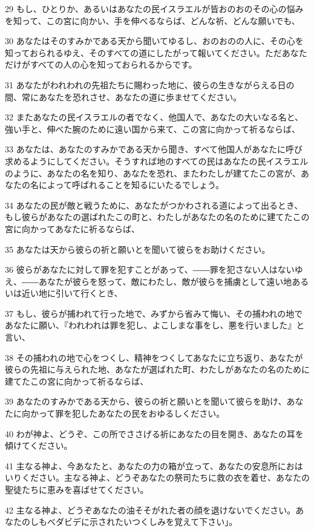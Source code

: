 \par 29 もし、ひとりか、あるいはあなたの民イスラエルが皆おのおのその心の悩みを知って、この宮に向かい、手を伸べるならば、どんな祈、どんな願いでも、
\par 30 あなたはそのすみかである天から聞いてゆるし、おのおのの人に、その心を知っておられるゆえ、そのすべての道にしたがって報いてください。ただあなただけがすべての人の心を知っておられるからです。
\par 31 あなたがわれわれの先祖たちに賜わった地に、彼らの生きながらえる日の間、常にあなたを恐れさせ、あなたの道に歩ませてください。
\par 32 またあなたの民イスラエルの者でなく、他国人で、あなたの大いなる名と、強い手と、伸べた腕のために遠い国から来て、この宮に向かって祈るならば、
\par 33 あなたは、あなたのすみかである天から聞き、すべて他国人があなたに呼び求めるようにしてください。そうすれば地のすべての民はあなたの民イスラエルのように、あなたの名を知り、あなたを恐れ、またわたしが建てたこの宮が、あなたの名によって呼ばれることを知るにいたるでしょう。
\par 34 あなたの民が敵と戦うために、あなたがつかわされる道によって出るとき、もし彼らがあなたの選ばれたこの町と、わたしがあなたの名のために建てたこの宮に向かってあなたに祈るならば、
\par 35 あなたは天から彼らの祈と願いとを聞いて彼らをお助けください。
\par 36 彼らがあなたに対して罪を犯すことがあって、――罪を犯さない人はないゆえ、――あなたが彼らを怒って、敵にわたし、敵が彼らを捕虜として遠い地あるいは近い地に引いて行くとき、
\par 37 もし、彼らが捕われて行った地で、みずから省みて悔い、その捕われの地であなたに願い、『われわれは罪を犯し、よこしまな事をし、悪を行いました』と言い、
\par 38 その捕われの地で心をつくし、精神をつくしてあなたに立ち返り、あなたが彼らの先祖に与えられた地、あなたが選ばれた町、わたしがあなたの名のために建てたこの宮に向かって祈るならば、
\par 39 あなたのすみかである天から、彼らの祈と願いとを聞いて彼らを助け、あなたに向かって罪を犯したあなたの民をおゆるしください。
\par 40 わが神よ、どうぞ、この所でささげる祈にあなたの目を開き、あなたの耳を傾けてください。
\par 41 主なる神よ、今あなたと、あなたの力の箱が立って、あなたの安息所におはいりください。主なる神よ、どうぞあなたの祭司たちに救の衣を着せ、あなたの聖徒たちに恵みを喜ばせてください。
\par 42 主なる神よ、どうぞあなたの油そそがれた者の顔を退けないでください。あなたのしもべダビデに示されたいつくしみを覚えて下さい」。

